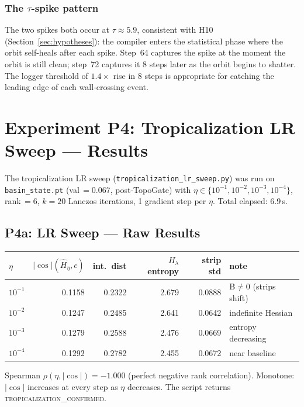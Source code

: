 \documentclass[11pt]{amsart}
\begin{document}
\subsubsection*{The $\tau$-spike pattern}

The two spikes both occur at $\tau \approx 5.9$, consistent with
H10 (Section~\ref{sec:hypotheses}): the compiler enters the
statistical phase where the orbit self-heals after each spike.
Step~64 captures the spike at the moment the orbit is still clean;
step~72 captures it 8 steps later as the orbit begins to shatter.
The logger threshold of $1.4\times$ rise in 8 steps is appropriate
for catching the leading edge of each wall-crossing event.

\section{Experiment P4: Tropicalization LR Sweep --- Results}
\label{sec:p4_results}

The tropicalization LR sweep (\texttt{tropicalization\_lr\_sweep.py})
was run on \texttt{basin\_state.pt} (val\,$=0.067$, post-TopoGate)
with $\eta \in \{10^{-1}, 10^{-2}, 10^{-3}, 10^{-4}\}$,
rank\,$=6$, $k=20$ Lanczos iterations, 1 gradient step per $\eta$.
Total elapsed: 6.9\,s.

\subsection{P4a: LR Sweep --- Raw Results}

\begin{center}
\small
\begin{tabular}{@{}lrrrrl@{}}
\toprule
$\eta$ & $|\cos|(\hat{H}_\eta, c)$ & int.\ dist & $H_\lambda$ entropy
       & strip std & note \\
\midrule
$10^{-1}$ & 0.1158 & 0.2322 & 2.679 & 0.0888 & B$\neq 0$ (strips shift) \\
$10^{-2}$ & 0.1247 & 0.2485 & 2.641 & 0.0642 & indefinite Hessian \\
$10^{-3}$ & 0.1279 & 0.2588 & 2.476 & 0.0669 & entropy decreasing \\
$10^{-4}$ & 0.1292 & 0.2782 & 2.455 & 0.0672 & near baseline \\
\bottomrule
\end{tabular}
\end{center}

Spearman $\rho(\eta, |\cos|) = -1.000$ (perfect negative rank correlation).
Monotone: $|\cos|$ increases at every step as $\eta$ decreases.
The script returns \textsc{tropicalization\_confirmed}.
\end{document}
